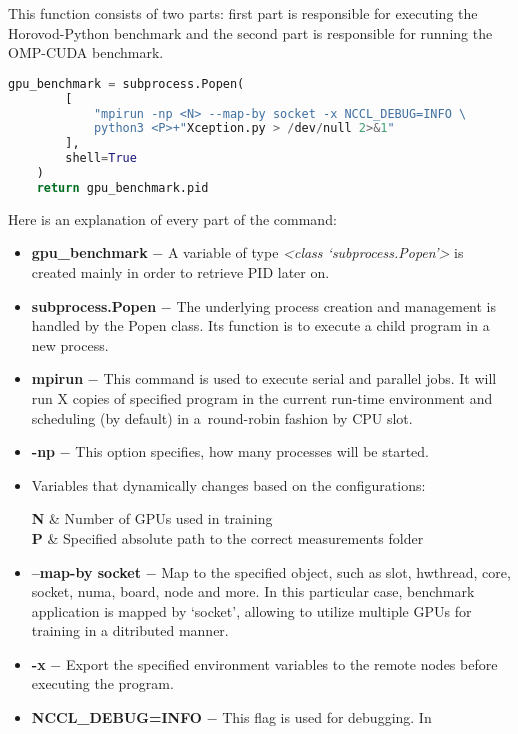 This function consists of two parts: first part is responsible for executing
the Horovod-Python benchmark and the second part is responsible for running
the OMP-CUDA benchmark.

\begin{lstlisting}[language=Python]
    gpu_benchmark = subprocess.Popen(
        [
            "mpirun -np <N> --map-by socket -x NCCL_DEBUG=INFO \
            python3 <P>+"Xception.py > /dev/null 2>&1"
        ],
        shell=True
    )
    return gpu_benchmark.pid
\end{lstlisting}

Here is an explanation of every part of the command:

\begin{itemize}
    \item \textbf{gpu\_benchmark} $-$ A variable of type
    \emph{<class `subprocess.Popen'>} is created mainly in order to
    retrieve PID later on.
    \item \textbf{subprocess.Popen} $-$ The underlying process creation and
    management is handled by the Popen class. Its function is to execute
    a child program in a new process.
    \item \textbf{mpirun} $-$ This command is used to execute serial and
    parallel jobs. It will run X copies of specified program in the current
    run-time environment and scheduling (by default) in a~round-robin fashion
    by CPU slot.
    \item \textbf{-np} $-$ This option specifies, how many processes will be
    started.
    \item Variables that dynamically changes based on the configurations:
    \begin{conditions}
        \textbf{N} & Number of GPUs used in training \\
        \textbf{P} & Specified absolute path to the correct measurements folder \\
    \end{conditions}
    \item \textbf{--map-by socket} $-$ Map to the specified object, such as 
    slot, hwthread, core, socket, numa, board, node and more. In this
    particular case, benchmark application is mapped by `socket', allowing to
    utilize multiple GPUs for training in a ditributed manner.
    \item \textbf{-x} $-$ Export the specified environment variables to the
    remote nodes before executing the program.
    \item \textbf{NCCL\_DEBUG=INFO} $-$ This flag is used for debugging. In

\end{itemize}

